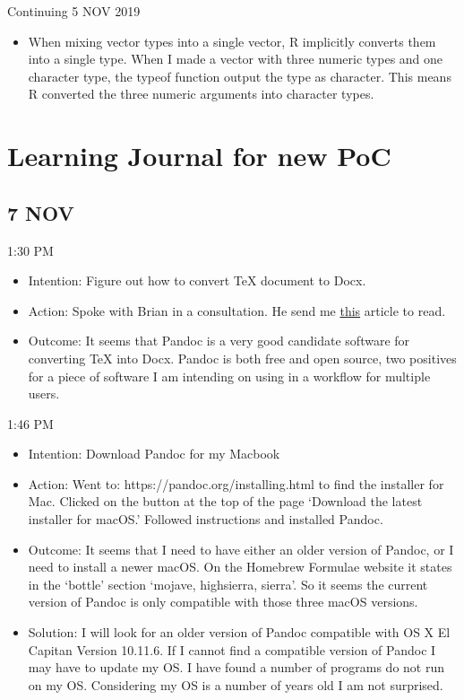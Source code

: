 \documentclass{article}
\begin{document}
Continuing 5 NOV 2019

\begin{itemize}
    \item When mixing vector types into a single vector, R implicitly converts them into a single type. When I made a vector with three numeric types and one character type, the typeof function output the type as character. This means R converted the three numeric arguments into character types.
\end{itemize}

\section{Learning Journal for new PoC}

\subsection{7 NOV}

1:30 PM
\begin{itemize}
    \item Intention: Figure out how to convert TeX document to Docx.
    \item Action: Spoke with Brian in a consultation. He send me \href{https://medium.com/@zhelin\-chen91/how-to-convert-from-latex-to-ms-word-with-pandoc-f2045a762293}{this} article to read.
    \item Outcome: It seems that Pandoc is a very good candidate software for converting TeX into Docx. Pandoc is both free and open source, two positives for a piece of software I am intending on using in a workflow for multiple users.
\end{itemize}

1:46 PM
\begin{itemize}
    \item Intention: Download Pandoc for my Macbook
    \item Action: Went to: https://pandoc.org/installing.html to find the installer for Mac. Clicked on the button at the top of the page `Download the latest installer for macOS.' Followed instructions and installed Pandoc. 
    \item Outcome: It seems that I need to have either an older version of Pandoc, or I need to install a newer macOS. On the Homebrew Formulae website it states in the `bottle' section `mojave, high\textunderscore sierra, sierra'. So it seems the current version of Pandoc is only compatible with those three macOS versions.
    \item Solution: I will look for an older version of Pandoc compatible with OS X El Capitan Version 10.11.6. If I cannot find a compatible version of Pandoc I may have to update my OS. I have found a number of programs do not run on my OS. Considering my OS is a number of years old I am not surprised.
\end{itemize}
\end{document}
